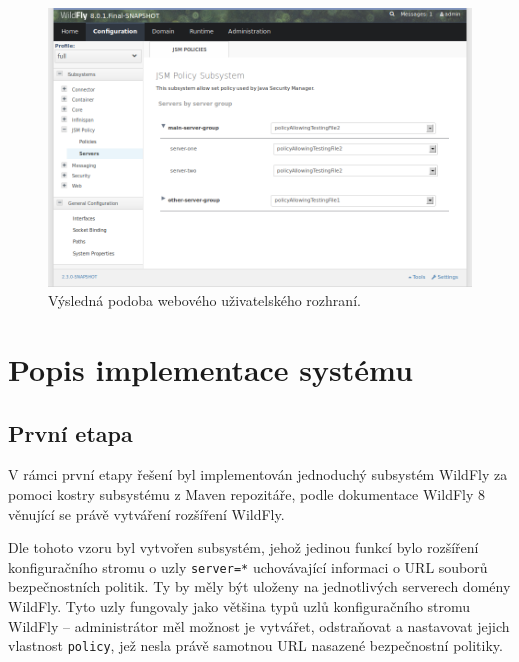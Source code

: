 \begin{figure}[ht]
  \centering
  \includegraphics[width=14cm]{fig/jsmpolicy-servers}
  \caption{Výsledná podoba webového uživatelského rozhraní.}
  \label{vysledneGui}
\end{figure}

\chapter{Popis implementace systému} \label{implementace}

\section{První etapa}

V rámci první etapy řešení byl implementován jednoduchý subsystém WildFly za pomoci kostry subsystému z Maven repozitáře, podle dokumentace WildFly 8 věnující se právě vytváření rozšíření WildFly. \cite{WildFlyExtending}

Dle tohoto vzoru byl vytvořen subsystém, jehož jedinou funkcí bylo rozšíření konfiguračního stromu o uzly {\tt server=*} uchovávající informaci o URL souborů bezpečnostních politik.
Ty by měly být uloženy na jednotlivých serverech domény WildFly.
Tyto uzly fungovaly jako většina typů uzlů konfiguračního stromu WildFly -- administrátor měl možnost je vytvářet, odstraňovat a nastavovat jejich vlastnost {\tt policy}, jež nesla právě samotnou URL nasazené bezpečnostní politiky.

